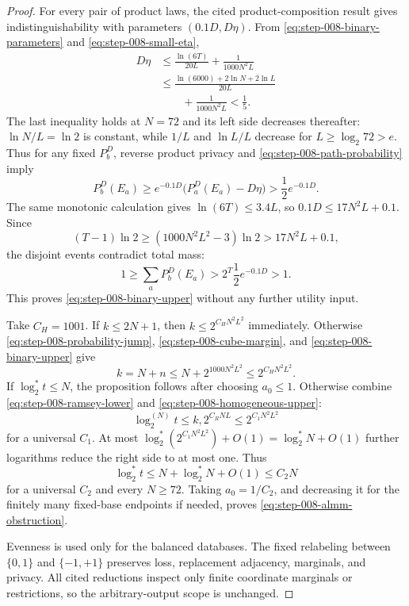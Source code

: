 \begin{proof}
For every pair of product laws, the cited product-composition result gives
indistinguishability with parameters \((0.1D,D\eta)\).  From
\eqref{eq:step-008-binary-parameters} and
\eqref{eq:step-008-small-eta},
\begin{equation}\label{eq:step-008-product-delta}
\begin{split}
D\eta
&\le\frac{\ln(6T)}{20L}+\frac1{1000N^2L}\\
&\le\frac{\ln(6000)+2\ln N+2\ln L}{20L}\\
&\qquad+\frac1{1000N^2L}<\frac15.
\end{split}
\end{equation}
The last inequality holds at \(N=72\) and its left side decreases
thereafter: \(\ln N/L=\ln2\) is constant, while \(1/L\) and
\(\ln L/L\) decrease for \(L\ge\log_2 72>e\).  Thus for any fixed
\(P_b^D\), reverse product privacy and
\eqref{eq:step-008-path-probability} imply
\begin{equation}\label{eq:step-008-reverse-product-privacy}
P_b^D(E_a)
\ge e^{-0.1D}\bigl(P_a^D(E_a)-D\eta\bigr)
>\frac12e^{-0.1D}.
\end{equation}
The same monotonic calculation gives \(\ln(6T)\le3.4L\), so
\(0.1D\le17N^2L+0.1\).  Since
\[
(T-1)\ln2
\ge(1000N^2L^2-3)\ln2
>17N^2L+0.1,
\]
the disjoint events contradict total mass:
\[
1\ge\sum_aP_b^D(E_a)
>2^T\frac12e^{-0.1D}>1.
\]
This proves \eqref{eq:step-008-binary-upper} without any further utility
input.

Take \(C_H=1001\).  If \(k\le2N+1\), then
\(k\le2^{C_HN^2L^2}\) immediately.  Otherwise
\eqref{eq:step-008-probability-jump},
\eqref{eq:step-008-cube-margin}, and
\eqref{eq:step-008-binary-upper} give
\begin{equation}\label{eq:step-008-homogeneous-upper}
k=N+n
\le N+2^{1000N^2L^2}
\le2^{C_HN^2L^2}.
\end{equation}
If \(\log_2^*t\le N\), the proposition follows after choosing
\(a_0\le1\).  Otherwise combine
\eqref{eq:step-008-ramsey-lower} and
\eqref{eq:step-008-homogeneous-upper}:
\begin{equation}\label{eq:step-008-iterate-upper}
\log_2^{(N)}t
\le k,2^{C_RNL}
\le2^{C_1N^2L^2}
\end{equation}
for a universal \(C_1\).  At most
\(\log_2^*(2^{C_1N^2L^2})+O(1)=\log_2^*N+O(1)\) further logarithms reduce
the right side to at most one.  Thus
\[
\log_2^*t\le N+\log_2^*N+O(1)\le C_2N
\]
for a universal \(C_2\) and every \(N\ge72\).  Taking
\(a_0=1/C_2\), and decreasing it for the finitely many fixed-base
endpoints if needed, proves \eqref{eq:step-008-almm-obstruction}.

Evenness is used only for the balanced databases.  The fixed relabeling
between \(\{0,1\}\) and \(\{-1,+1\}\) preserves loss, replacement
adjacency, marginals, and privacy.  All cited reductions inspect only
finite coordinate marginals or restrictions, so the arbitrary-output
scope is unchanged.
\end{proof}


